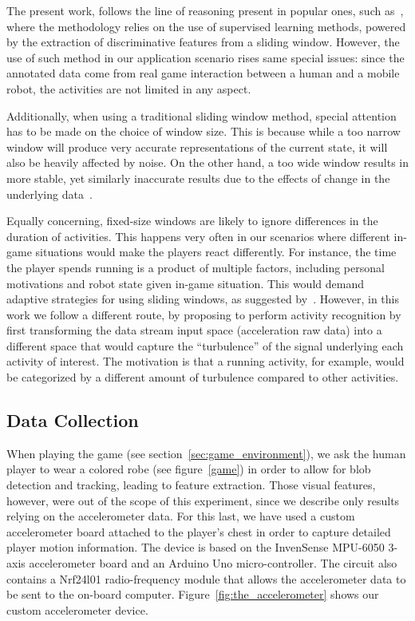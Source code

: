 The present work, follows the line of reasoning present in popular ones, such as~\cite{ravi_activity_2005, bao_activity_2004}, where the methodology relies on the use of supervised learning methods, powered by the extraction of discriminative features from a sliding window. However, the use of such method in our application scenario rises same special issues: since the annotated data come from real game interaction between a human and a mobile robot, the activities are not limited in any aspect.

Additionally, when using a traditional sliding window method, special attention has to be made on the choice of window size. This is because while a too narrow window will produce very accurate representations of the current state, it will also be heavily affected by noise. On the other hand, a too wide window results in more stable, yet similarly inaccurate results due to the effects of change in the underlying data~\cite{bifet_learning_2007}. 

Equally concerning, fixed-size windows are likely to ignore differences in the duration of activities. This happens very often in our scenarios where different in-game situations would make the players react differently. For instance, the time the player spends running is a product of multiple factors, including personal motivations and robot state given in-game situation. This would demand adaptive strategies for using sliding windows, as suggested by~\cite{noor_adaptive_2016}. However, in this work we follow a different route, by proposing to perform activity recognition by first transforming the data stream input space (acceleration raw data) into a different space that would capture the ``turbulence'' of the signal underlying each activity of interest. The motivation is that a running activity, for example, would be categorized by a different amount of turbulence compared to other activities.

\subsection{Data Collection}\label{datacollection}

When playing the game (see section~\ref{sec:game_environment}), we ask the human player to wear a colored robe (see figure~\ref{game}) in order to allow for blob detection and tracking, leading to feature extraction. Those visual features, however, were out of the scope of this experiment, since we describe only results relying on the accelerometer data. For this last, we have used a custom accelerometer board attached to the player's chest in order to capture detailed player motion information. The device is based on the InvenSense MPU-6050 3-axis accelerometer board and an Arduino Uno micro-controller. The circuit also contains a Nrf24l01 radio-frequency module that allows the accelerometer data to be sent to the on-board computer. Figure~\ref{fig:the_accelerometer} shows our custom accelerometer device.

